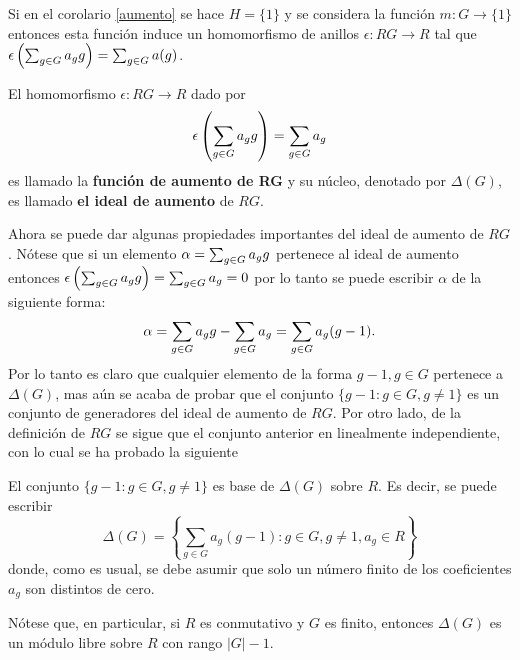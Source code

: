 \begin{nota}
Si en el corolario \ref{aumento} se hace $H=\{1\}$ y se considera la función $m \colon G \to \{1\}$ entonces esta función induce un homomorfismo de anillos $\epsilon \colon RG \to R$ tal que $\epsilon\left(\sum_{g \in G} a_{g} g\right) = \sum_{g \in G} a(g)$. 
\end{nota}
\begin{definicion}
El homomorfismo $\epsilon \colon RG \to R$ dado por \[ \epsilon \left( \sum_{g \in G} a_{g} g\right) = \sum_{g \in G}a_g \] es llamado la \textbf{ función de aumento de RG} y su núcleo, denotado por $\Delta (G)$, es llamado \textbf{el ideal de aumento} de $RG$.
\end{definicion}
Ahora se puede dar algunas propiedades importantes del ideal de aumento de $RG$. Nótese que si un elemento $\alpha = \sum_{g \in G} a_{g} g$ pertenece al ideal de aumento entonces $ \epsilon \left( \sum_{g \in G} a_{g} g\right) = \sum_{g \in G}a_g = 0 $ por lo tanto se puede escribir $\alpha$ de la siguiente forma: 
\[\alpha = \sum_{g \in G} a_{g} g -\sum_{g \in G}a_g = \sum_{g \in G}a_g(g-1). \]
Por lo tanto es claro que cualquier elemento de la forma $g-1, g \in G$ pertenece a $\Delta(G)$, mas aún se acaba de probar que el conjunto $\{g-1 : g \in G, g \neq 1\}$ es un conjunto de generadores del ideal de aumento de $RG$. Por otro lado, de la definición de $RG$ se sigue que el conjunto anterior en linealmente independiente, con lo cual se ha probado la siguiente
\begin{proposicion} \label{gen}
El conjunto $\{ g-1 : g \in G , g \neq 1\}$ es base de $\Delta (G)$ sobre $R$. Es decir, se puede escribir
\begin{equation*}
\Delta (G) = \left\{ \sum_{g \in G} a_g(g-1) : g \in G , g \neq 1, a_g \in R \right\}
\end{equation*}
donde, como es usual, se debe asumir que solo un número finito de los coeficientes $a_g$ son distintos de cero.
\end{proposicion}
Nótese que, en particular, si $R$ es conmutativo y $G$ es finito, entonces $\Delta (G)$ es un módulo libre sobre $R$ con rango $|G|-1$.

